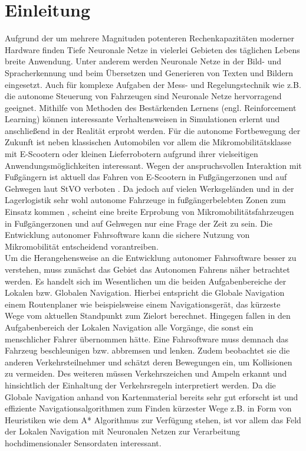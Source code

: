 
\cleardoublepage
\chapter{Einleitung}\label{ch:Einleitung}

Aufgrund der um mehrere Magnituden potenteren Rechenkapazitäten moderner Hardware
finden Tiefe Neuronale Netze in vielerlei Gebieten des täglichen Lebens breite
Anwendung. Unter anderem werden Neuronale Netze in der Bild- und Spracherkennung
und beim Übersetzen und Generieren von Texten und Bildern eingesetzt.
Auch für komplexe Aufgaben der Mess- und Regelungstechnik wie z.B. die autonome
Steuerung von Fahrzeugen sind Neuronale Netze hervorragend geeignet. Mithilfe von
Methoden des Bestärkenden Lernens (engl. Reinforcement Learning) können interessante
Verhaltensweisen in Simulationen erlernt und anschließend in der Realität erprobt werden.
Für die autonome Fortbewegung der Zukunft ist neben klassischen Automobilen vor allem
die Mikromobilitätsklasse mit E-Scootern oder kleinen Lieferrobotern aufgrund ihrer
vielseitigen Anwendungsmöglichkeiten interessant. Wegen der anspruchsvollen Interaktion
mit Fußgängern ist aktuell das Fahren von E-Scootern in Fußgängerzonen und auf Gehwegen laut
StVO verboten \cite{ekfv2019}. Da jedoch auf vielen Werksgeländen und in der Lagerlogistik
sehr wohl autonome Fahrzeuge in fußgängerbelebten Zonen zum Einsatz kommen \cite{ivm2019},
scheint eine breite Erprobung von Mikromobilitätsfahrzeugen in Fußgängerzonen und auf
Gehwegen nur eine Frage der Zeit zu sein. Die Entwicklung autonomer Fahrsoftware kann
die sichere Nutzung von Mikromobilität entscheidend vorantreiben.\\

Um die Herangehensweise an die Entwicklung autonomer Fahrsoftware besser zu verstehen,
muss zunächst das Gebiet das Autonomen Fahrens näher betrachtet werden. Es handelt sich
im Wesentlichen um die beiden Aufgabenbereiche der Lokalen bzw. Globalen Navigation.
Hierbei entspricht die Globale Navigation einem Routenplaner wie beispielsweise einem
Navigationsgerät, das kürzeste Wege vom aktuellen Standpunkt zum Zielort berechnet.
Hingegen fallen in den Aufgabenbereich der Lokalen Navigation alle Vorgänge, die sonst
ein menschlicher Fahrer übernommen hätte. Eine Fahrsoftware muss demnach das Fahrzeug
beschleunigen bzw. abbremsen und lenken. Zudem beobachtet sie die anderen Verkehrsteilnehmer
und schätzt deren Bewegungen ein, um Kollisionen zu vermeiden. Des weiteren müssen Verkehrszeichen
und Ampeln erkannt und hinsichtlich der Einhaltung der Verkehrsregeln interpretiert werden.
Da die Globale Navigation anhand von Kartenmaterial bereits sehr gut erforscht ist und
effiziente Navigationsalgorithmen zum Finden kürzester Wege z.B. in Form von Heuristiken
wie dem A* Algorithmus zur Verfügung stehen, ist vor allem das Feld der Lokalen
Navigation mit Neuronalen Netzen zur Verarbeitung hochdimensionaler Sensordaten
interessant.\\

